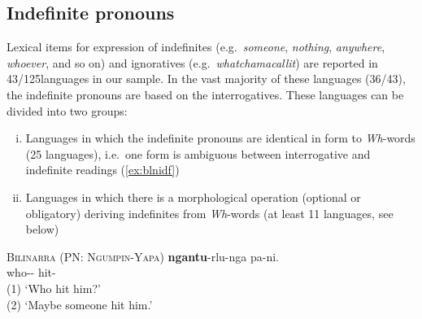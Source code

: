 \documentclass[12pt,egregdoesnotlikesansseriftitles]{scrartcl}
\makeatletter
\newcommand{\ofy}{/125} %
\makeatother
\begin{document}
\subsection{Indefinite pronouns}
\label{sec:indefs}
Lexical items for expression of indefinites (e.g.\ \textit{someone}, \textit{nothing}, \textit{anywhere}, \textit{whoever}, and so on) and ignoratives (e.g.\ \textit{whatchamacallit}) are reported in 43\ofy languages in our sample. In the vast majority of these languages (36/43), the indefinite pronouns are based on the interrogatives. These languages can be divided into two groups:

\begin{enumerate}[(i)]
\item Languages in which the indefinite pronouns are identical in form to \textit{Wh}-words (25 languages), i.e.\ one form is ambiguous between interrogative and indefinite readings (\ref{ex:blnidf})
\item Languages in which there is a morphological operation (optional or obligatory) deriving indefinites from \textit{Wh}-words (at least 11 languages, see below)
\end{enumerate}
\begin{exe}
  \ex\label{ex:blnidf} \textsc{Bilinarra (PN: Ngumpin-Yapa)}\hfill {}
  \gll \textbf{ngantu}-rlu-nga pa-ni.\\
  who-\Erg-\Dub{} hit-\Pst{}\\
  \glt (1) `Who hit him?'\\
  (2) `Maybe someone hit him.'
\end{exe}
\end{document}
